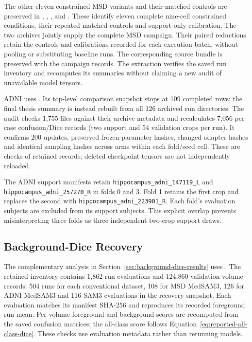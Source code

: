 \documentclass[12pt,a4paper]{article}
\begin{document}
The other eleven constrained MSD variants and their matched controls
are preserved in
, ,
,  and
. These identify eleven complete nine-cell constrained
conditions, their repeated matched controls and support-only calibration.
The two archives jointly supply the complete MSD campaign. Their
paired reductions retain the controls and calibrations recorded for
each execution batch, without pooling or substituting baseline runs.
The corresponding source bundle is preserved with the campaign records.
The extraction verifies the saved run inventory and recomputes its
summaries without claiming a new audit of unavailable model tensors.

ADNI uses
.
Its top-level comparison snapshot stops at 109 completed rows; the
final thesis summary is instead rebuilt from all 126 archived run
directories. The audit checks 1,755 files against their archive
metadata and recalculates 7,056 per-case confusion/Dice records
(two support and 54 validation crops per run). It confirms 200 updates,
preserved frozen-parameter hashes, changed adapter
hashes and identical sampling hashes across arms within each fold/seed
cell. These are checks of retained records; deleted checkpoint tensors
are not independently reloaded.

The ADNI support manifests retain
\texttt{hippocampus\_adni\_147119\_L} and
\texttt{hippocampus\_adni\_257270\_R} in folds 0 and 3.
Fold 1 retains the first crop and replaces the second with
\texttt{hippocampus\_adni\_223901\_R}. Each fold's evaluation subjects
are excluded from its support subjects. This explicit overlap prevents
misinterpreting three folds as three independent two-crop support draws.

\subsection{Background-Dice Recovery}
\label{sec:background-dice-evidence}

The complementary analysis in Section~\ref{sec:background-dice-results}
uses .
The retained inventory contains 1,862 run evaluations and 124,860
validation-volume records: 504 runs for each conventional dataset,
108 for MSD MedSAM3, 126 for ADNI MedSAM3 and 116
SAM3 evaluations in the recovery snapshot. Each evaluation matches
its manifest SHA-256 and reproduces its recorded foreground run mean.
Per-volume foreground and background scores are recomputed from the
saved confusion matrices; the all-class score follows
Equation~\ref{eq:reported-all-class-dice}. These checks use evaluation
metadata rather than rerunning models.
\end{document}
